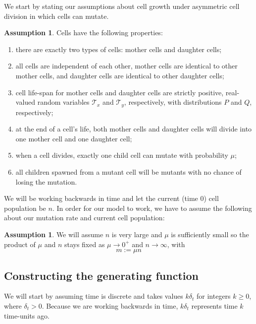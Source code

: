 \documentclass[12pt]{amsart}
\theoremstyle{plain}
\theoremstyle{definition}
\theoremstyle{remark}
\theoremstyle{definition}
\newtheorem{assume}[thm]{Assumption}
\begin{document}
We start by stating our assumptions about cell growth under asymmetric cell division in which cells can mutate.

\begin{assume} Cells have the following properties:
\begin{enumerate}
\item there are exactly two types of cells: mother cells and daughter cells;
\item all cells are independent of each other, mother cells are identical to other mother cells, and daughter cells are identical to other daughter cells;
\item cell life-span for mother cells and daughter cells are strictly positive, real-valued random variables $\mathcal{T}_x$ and $\mathcal{T}_y$, respectively, with distributions $P$ and $Q$, respectively;
\item at the end of a cell's life, both mother cells and daughter cells will divide into one mother cell and one daughter cell;
\item when a cell divides, exactly one child cell can mutate with probability $\mu$;
\item all children spawned from a mutant cell will be mutants with no chance of losing the mutation.
\end{enumerate}
\end{assume}

We will be working backwards in time and let the current (time 0) cell population be $n$. In order for our model to work, we have to assume the following about our mutation rate and current cell population:

\begin{assume} \label{nLarge}
We will assume $n$ is very large and $\mu$ is sufficiently small so the product of $\mu$ and $n$ stays fixed as $\mu \to 0^+$ and $n \to \infty$, with
\begin{equation}
m := \mu n \label{def m}
\end{equation}
\end{assume}

\subsection{Constructing the generating function}
We will start by assuming time is discrete and takes values $k\delta_t$ for integers $k \geq 0$, where $\delta_t > 0$. Because we are working backwards in time, $k \delta_t$ represents time $k$ time-units ago.
\end{document}
